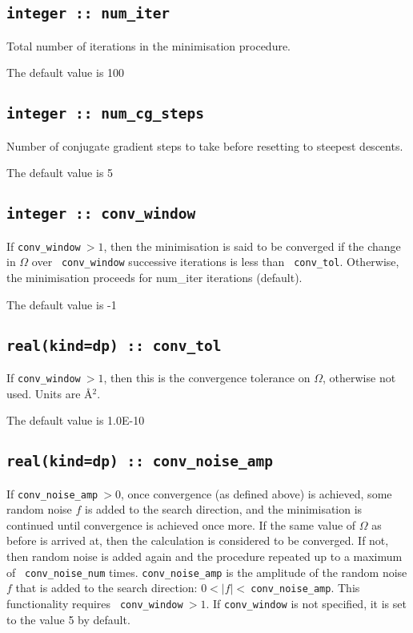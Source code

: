 \subsection[num\_iter]{\tt integer :: num\_iter}

Total number of iterations in the minimisation procedure.

The default value is 100

\subsection[num\_cg\_steps]{\tt integer :: num\_cg\_steps}

Number of conjugate gradient steps to take before resetting to steepest descents.

The default value is 5

\subsection[conv\_window]{\tt integer :: conv\_window}

If {\tt conv\_window}$\:>1$, then the minimisation is said to be
  converged if the change in $\Omega$ over {\tt
  conv\_window} successive iterations is less than {\tt
  conv\_tol}. Otherwise, the minimisation proceeds for
  {num\_iter} iterations (default).

The default value is -1

\subsection[conv\_tol]{\tt real(kind=dp) :: conv\_tol}

If {\tt conv\_window}$\:>1$, then this is the convergence tolerance on
$\Omega$, otherwise not used. Units are \AA$^2$.

The default value is 1.0E-10

\subsection[conv\_noise\_amp]{\tt real(kind=dp) :: conv\_noise\_amp}

If {\tt conv\_noise\_amp}$\:>0$, once convergence (as defined above) is
achieved, some random noise $f$ is added to the search direction, and the
minimisation is continued until convergence is achieved once more. If 
the same value of $\Omega$ as before is arrived at, then the calculation
is considered to be converged. If not, then random noise is added
again and the procedure repeated up to a maximum of {\tt
  conv\_noise\_num} times. {\tt conv\_noise\_amp} is the amplitude of
the random noise $f$ that is added to the search direction: 
$0 < |f| <\:${\tt conv\_noise\_amp}. This functionality requires {\tt
  conv\_window}$\:>1$. If {\tt conv\_window} is not specified, it is set
to the value 5 by default. 


